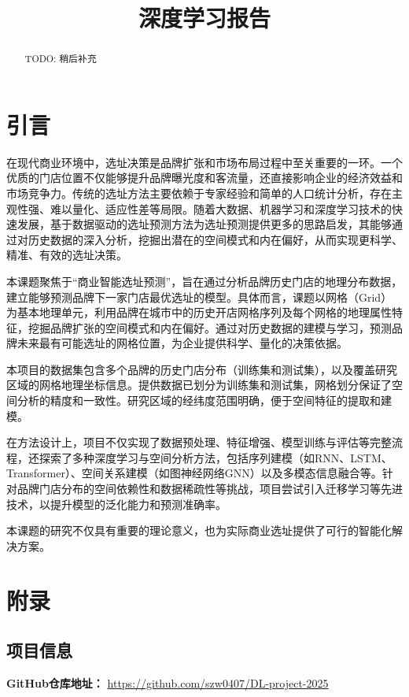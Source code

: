\documentclass{article}
\title{深度学习报告}
\begin{document}
\maketitle

\begin{abstract}
      TODO: 稍后补充
\end{abstract}

\newpage

\tableofcontents
\newpage
\section{引言}
在现代商业环境中，选址决策是品牌扩张和市场布局过程中至关重要的一环。一个优质的门店位置不仅能够提升品牌曝光度和客流量，还直接影响企业的经济效益和市场竞争力。传统的选址方法主要依赖于专家经验和简单的人口统计分析，存在主观性强、难以量化、适应性差等局限。随着大数据、机器学习和深度学习技术的快速发展，基于数据驱动的选址预测方法为选址预测提供更多的思路启发，其能够通过对历史数据的深入分析，挖掘出潜在的空间模式和内在偏好，从而实现更科学、精准、有效的选址决策。

本课题聚焦于“商业智能选址预测”，旨在通过分析品牌历史门店的地理分布数据，建立能够预测品牌下一家门店最优选址的模型。具体而言，课题以网格（Grid）为基本地理单元，利用品牌在城市中的历史开店网格序列及每个网格的地理属性特征，挖掘品牌扩张的空间模式和内在偏好。通过对历史数据的建模与学习，预测品牌未来最有可能选址的网格位置，为企业提供科学、量化的决策依据。

本项目的数据集包含多个品牌的历史门店分布（训练集和测试集），以及覆盖研究区域的网格地理坐标信息。提供数据已划分为训练集和测试集，网格划分保证了空间分析的精度和一致性。研究区域的经纬度范围明确，便于空间特征的提取和建模。

在方法设计上，项目不仅实现了数据预处理、特征增强、模型训练与评估等完整流程，还探索了多种深度学习与空间分析方法，包括序列建模（如RNN、LSTM、Transformer）、空间关系建模（如图神经网络GNN）以及多模态信息融合等。针对品牌门店分布的空间依赖性和数据稀疏性等挑战，项目尝试引入迁移学习等先进技术，以提升模型的泛化能力和预测准确率。

本课题的研究不仅具有重要的理论意义，也为实际商业选址提供了可行的智能化解决方案。

\appendix
\section{附录}

\subsection{项目信息}
\textbf{GitHub仓库地址：} \url{https://github.com/szw0407/DL-project-2025}
\end{document}
